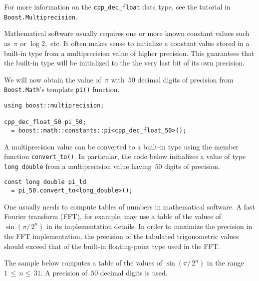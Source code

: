 \documentclass{article}[10pt]
\begin{document}
For more information on the \lstinline|cpp_dec_float| data type,
see the tutorial in \lstinline|Boost.Multiprecision|.

Mathematical software usually requires one or more
known constant values such as~$\pi$ or $\log{2}$,~etc.
It often makes sense
to initialize a constant value stored in a built-in type
from a multiprecision value of higher precision.
This guarantees that the built-in type will be initialized
to the the very last bit of its own precision.

We will now obtain the value of~$\pi$ with~$50$ decimal
digits of precision from \lstinline|Boost.Math|'s
template \lstinline|pi()| function.

\begin{lstlisting}
using boost::multiprecision;

cpp_dec_float_50 pi_50;
  = boost::math::constants::pi<cpp_dec_float_50>();
\end{lstlisting}

A multiprecision value can be converted to a built-in type
using the member function \lstinline|convert_to()|.
In particular, the code below initializes a
value of type \lstinline|long double| from
a multiprecision value having~$50$ digits of precision.

\begin{lstlisting}
const long double pi_ld
  = pi_50.convert_to<long_double>();
\end{lstlisting}

One usually needs to compute tables of numbers in
mathematical software. A fast Fourier transform (FFT),
for example, may use a table of the values of
$\sin\left({\pi /\,2^n}\right)$
in its implementation details. In order to maximize the
precision in the FFT implementation, the precision of the
tabulated trigonometric values should exceed that of the
built-in floating-point type used in the FFT.

The sample below computes a table of the values of
$\sin\left({\pi /\,2^n}\right)$ in the range
$1\,\le\,n\le\,31$.
A precision of~$50$ decimal digits is used.
\end{document}
